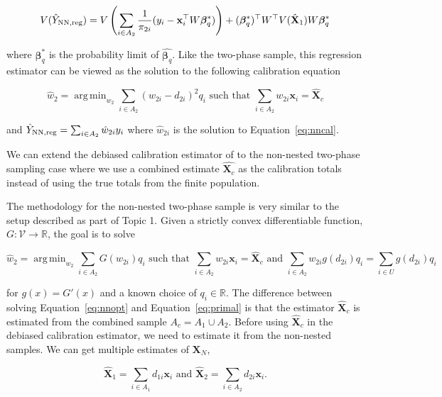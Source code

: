 \documentclass[12pt]{article}
\DeclareMathOperator*{\argmin}{arg\,min}
\renewcommand{\bf}[1]{\mathbf{#1}}
\begin{document}
$$
V(\hat Y_{\rm NN, reg}) = 
V\left(\sum_{i \in A_2} \frac{1}{\pi_{2i}}(y_i - \bf x_i^\top W\bm \beta^*_q)\right)
+ (\bm \beta^*_q)^\top W^\top V(\hat{\bf X}_1) W \bm \beta_q^*
$$

where $\bm \beta_q^*$ is the probability limit of $\hat{\bm \beta_q}$. Like the
two-phase sample, this regression estimator can be viewed as the solution to the
following calibration equation 

\begin{equation}\label{eq:nncal}
  \hat w_2 = \argmin_{w_2} \sum_{i \in A_2} (w_{2i} - d_{2i})^2 q_i 
  \text{ such that } \sum_{i \in A_2} w_{2i} \bf x_i = \hat{\bf X}_c
\end{equation}

and $\hat Y_{\rm NN, reg} = \sum_{i \in A_2} \hat w_{2i} y_i$ where $\hat
w_{2i}$ is the solution to Equation~\ref{eq:nncal}.

We can extend the debiased calibration estimator of \cite{kwon2024debiased} to
the non-nested two-phase sampling case where we use a combined estimate
$\hat{\bm X_c}$ as the calibration totals instead of using the true totals from
the finite population.


The methodology for the non-nested two-phase sample is very similar to the setup
described as part of Topic 1. Given a strictly convex differentiable function,
$G: \mathcal{V} \to \mathbb{R}$, the goal is to solve

\begin{equation}\label{eq:nnopt}
\hat w_2 = \argmin_{w_2} \sum_{i \in A_2} G\left(w_{2i}\right) q_i 
\text{ such that } 
\sum_{i \in A_2} w_{2i} \bf x_i = \hat{\bf X}_{c} \text{ and } 
\sum_{i \in A_2} w_{2i} g(d_{2i}) q_i = \sum_{i \in U} g(d_{2i}) q_i
\end{equation}

for $g(x) = G'(x)$ and a known choice of $q_i \in \mathbb{R}$. 
The difference
between solving Equation~\ref{eq:nnopt} and Equation~\ref{eq:primal} is that the
estimator $\hat{\bf X}_c$ is estimated from the combined sample $A_c = A_1 \cup
A_2$. Before using $\hat{\bf X}_c$ in the debiased calibration estimator, we
need to estimate it from the non-nested samples. We can get multiple estimates
of $\bf X_N$, 

$$
\hat{\bf X}_1 = \sum_{i \in A_1} d_{1i} \bf x_i \text{ and }
\hat{\bf X}_2 = \sum_{i \in A_2} d_{2i} \bf x_i.
$$
\end{document}
